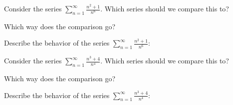 \documentclass{ximera}
\begin{document}
\begin{problem}
Consider the series $\sum_{n=1}^\infty \frac{n^2 +1}{n^6}$.
Which series should we compare this to?

\begin{multipleChoice}
\end{multipleChoice}

Which way does the comparison go?
\begin{multipleChoice}
\end{multipleChoice}

Describe the behavior of the series $\sum_{n=1}^\infty \frac{n^2+1}{n^6}:$
\begin{multipleChoice}
\end{multipleChoice}

\end{problem}



\begin{problem}
Consider the series $\sum_{n=1}^\infty \frac{n^3+4}{n^4}$.
Which series should we compare this to?

\begin{multipleChoice}
\end{multipleChoice}

Which way does the comparison go?
\begin{multipleChoice}
\end{multipleChoice}

Describe the behavior of the series $\sum_{n=1}^\infty \frac{n^3 + 4}{n^4}:$
\begin{multipleChoice}
\end{multipleChoice}

\end{problem}
\end{document}
